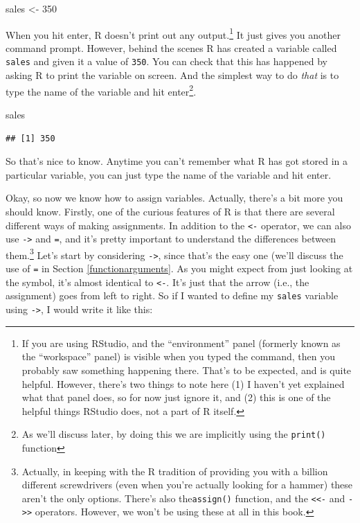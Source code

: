 \documentclass[
]{book}
\newenvironment{Shaded}{\begin{snugshade}}{\end{snugshade}}
\newcommand{\DecValTok}[1]{\textcolor[rgb]{0.00,0.00,0.81}{#1}}
\newcommand{\NormalTok}[1]{#1}
\newcommand{\OtherTok}[1]{\textcolor[rgb]{0.56,0.35,0.01}{#1}}
\begin{document}
\begin{Shaded}
\begin{Highlighting}[]
\NormalTok{sales }\OtherTok{\textless{}{-}} \DecValTok{350}
\end{Highlighting}
\end{Shaded}

When you hit enter, R doesn't print out any output.\footnote{If you are using RStudio, and the ``environment'' panel (formerly known as the ``workspace'' panel) is visible when you typed the command, then you probably saw something happening there. That's to be expected, and is quite helpful. However, there's two things to note here (1) I haven't yet explained what that panel does, so for now just ignore it, and (2) this is one of the helpful things RStudio does, not a part of R itself.} It just gives you another command prompt. However, behind the scenes R has created a variable called \texttt{sales} and given it a value of \texttt{350}. You can check that this has happened by asking R to print the variable on screen. And the simplest way to do \emph{that} is to type the name of the variable and hit enter\footnote{As we'll discuss later, by doing this we are implicitly using the \texttt{print()} function}.

\begin{Shaded}
\begin{Highlighting}[]
\NormalTok{sales}
\end{Highlighting}
\end{Shaded}

\begin{verbatim}
## [1] 350
\end{verbatim}

So that's nice to know. Anytime you can't remember what R has got stored in a particular variable, you can just type the name of the variable and hit enter.

Okay, so now we know how to assign variables. Actually, there's a bit more you should know. Firstly, one of the curious features of R is that there are several different ways of making assignments. In addition to the \texttt{\textless{}-} operator, we can also use \texttt{-\textgreater{}} and \texttt{=}, and it's pretty important to understand the differences between them.\footnote{Actually, in keeping with the R tradition of providing you with a billion different screwdrivers (even when you're actually looking for a hammer) these aren't the only options. There's also the\texttt{assign()} function, and the \texttt{\textless{}\textless{}-} and \texttt{-\textgreater{}\textgreater{}} operators. However, we won't be using these at all in this book.} Let's start by considering \texttt{-\textgreater{}}, since that's the easy one (we'll discuss the use of \texttt{=} in Section \ref{functionarguments}. As you might expect from just looking at the symbol, it's almost identical to \texttt{\textless{}-}. It's just that the arrow (i.e., the assignment) goes from left to right. So if I wanted to define my \texttt{sales} variable using \texttt{-\textgreater{}}, I would write it like this:
\end{document}
